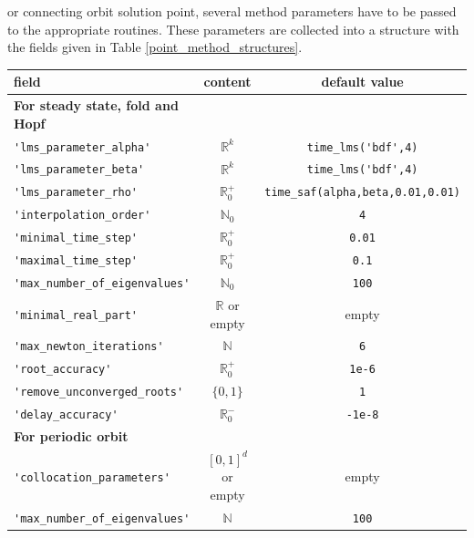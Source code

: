 \documentclass[10pt]{scrartcl}
\newcommand{\RR}{\mathbb{R}}
\newcommand{\NN}{\mathbb{N}}
\newcommand{\blist}[1]{\mbox{\lstinline!#1!}}
\begin{document}
or connecting
orbit solution point,
several method parameters have to be passed to the appropriate routines.
These parameters are collected into a structure with the fields
given in Table \ref{point_method_structures}.
\begin{table}[htbp]
\begin{center}
\begin{tabular}{l@{\hspace*{1em}}c@{\hspace*{1em}}c}\hline\noalign{\smallskip}
 field                        & content              & default value  \\\hline\noalign{\smallskip} 
\textbf{For steady state, fold and Hopf}\\\noalign{\smallskip}
\blist{'lms_parameter_alpha'}        & $\RR^k$              & \blist{time_lms('bdf',4)} \\
\blist{'lms_parameter_beta'}         & $\RR^k$              & \blist{time_lms('bdf',4)} \\
\blist{'lms_parameter_rho'}          & $\RR^+_0$            & \blist{time_saf(alpha,beta,0.01,0.01)} \\
\blist{'interpolation_order'}         & $\NN_0$              & \blist{4} \\
\blist{'minimal_time_step'}          & $\RR^+_0$            & \blist{0.01} \\
\blist{'maximal_time_step'}          & $\RR^+_0$            & \blist{0.1} \\
\blist{'max_number_of_eigenvalues'} & $\NN_0$              & \blist{100} \\
\blist{'minimal_real_part'}          & $\RR$ or empty       & empty \\
\blist{'max_newton_iterations'}      & $\NN$                & \blist{6} \\ 
\blist{'root_accuracy'}               & $\RR^+_0$            & \blist{1e-6} \\
\blist{'remove_unconverged_roots'}   & $\{0,1\}$            & \blist{1} \\
\blist{'delay_accuracy'}              & $\RR_0^-$            & \blist{-1e-8}
\\\noalign{\medskip}
\textbf{For periodic orbit}\\\noalign{\smallskip}
\blist{'collocation_parameters'}      & $[0,1]^d$ or empty   & empty \\
\blist{'max_number_of_eigenvalues'} & $\NN$                & \blist{100} \\

\end{tabular}
\end{center}
\end{table}
\end{document}
